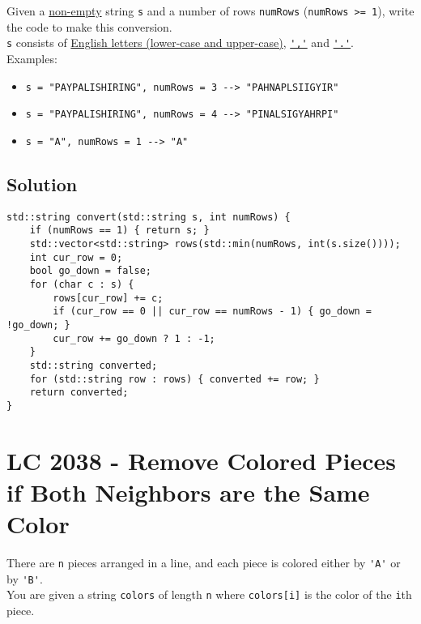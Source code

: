 {Given a \ul{non-empty} string {\colorbox{CodeBackground}{\lstinline|s|}} and a number of rows {\colorbox{CodeBackground}{\lstinline|numRows|}} ({\colorbox{CodeBackground}{\lstinline|numRows >= 1|}}), write the code to make this conversion.\\

{\colorbox{CodeBackground}{\lstinline|s|}} consists of \ul{English letters (lower-case and upper-case)}, \ul{{\colorbox{CodeBackground}{\lstinline|','|}}} and \ul{{\colorbox{CodeBackground}{\lstinline|'.'|}}}.\\

Examples:
\begin{itemize}
	\item {\colorbox{CodeBackground}{\lstinline|s = "PAYPALISHIRING", numRows = 3 --> "PAHNAPLSIIGYIR"|}}
	\item {\colorbox{CodeBackground}{\lstinline|s = "PAYPALISHIRING", numRows = 4 --> "PINALSIGYAHRPI"|}}
	\item {\colorbox{CodeBackground}{\lstinline|s = "A", numRows = 1 --> "A"|}}
\end{itemize}

\subsection*{Solution}
\begin{lstlisting}
std::string convert(std::string s, int numRows) {
	if (numRows == 1) { return s; }
	std::vector<std::string> rows(std::min(numRows, int(s.size())));
	int cur_row = 0;
	bool go_down = false;
	for (char c : s) {
		rows[cur_row] += c;
		if (cur_row == 0 || cur_row == numRows - 1) { go_down = !go_down; }
		cur_row += go_down ? 1 : -1;
	}
	std::string converted;
	for (std::string row : rows) { converted += row; }
	return converted;
}
\end{lstlisting}

\section{LC 2038 - Remove Colored Pieces if Both Neighbors are the Same Color}
There are {\colorbox{CodeBackground}{\lstinline|n|}} pieces arranged in a line, and each piece is colored either by {\colorbox{CodeBackground}{\lstinline|'A'|}} or by {\colorbox{CodeBackground}{\lstinline|'B'|}}. \\

You are given a string {\colorbox{CodeBackground}{\lstinline|colors|}} of length {\colorbox{CodeBackground}{\lstinline|n|}} where {\colorbox{CodeBackground}{\lstinline|colors[i]|}} is the color of the {\colorbox{CodeBackground}{\lstinline|i|}}th piece.\\

}
